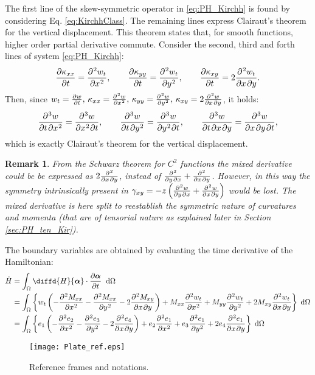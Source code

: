\documentclass[preprint,12pt]{elsarticle}
\newtheorem{remark}{Remark}
\newcommand{\revOne}[1]{\textcolor{blue!80!black}{#1}}
\begin{document}
\revOne{ The first line of the skew-symmetric operator in \eqref{eq:PH_Kirchh} is found by considering Eq. \eqref{eq:KirchhClass}. The remaining lines express Clairaut’s theorem for the vertical displacement. This theorem states that, for smooth functions, higher order partial derivative commute. Consider the second, third and forth lines of system \eqref{eq:PH_Kirchh}:
\[ \diffp{\kappa_{xx}}{t} = \diffp[2]{w_t}{x}, \qquad \diffp{\kappa_{yy}}{t} = \diffp[2]{w_t}{y}, \qquad  \diffp{\kappa_{xy}}{t} = 2 \diffp{w_t}{x,y}.
\] Then, since $w_t = \diffp{w}{t}, \, \kappa_{xx} = \diffp[2]{w}{x}, \, \kappa_{yy} = \diffp[2]{w}{y}, \, \kappa_{xy} = 2 \diffp{w}{x, y}$, it holds:
\[ \diffp[1,2]{w}{t,x} = \diffp[2,1]{w}{x,t}, \qquad \diffp[1,2]{w}{t,y} = \diffp[2,1]{w}{y,t}, \qquad  \diffp{w}{t,x,y} = \diffp{w}{x,y,t},  
\] 
which is exactly Clairaut’s theorem for the vertical displacement.
}
\begin{remark}
	From the Schwarz theorem for $C^2$ functions the mixed derivative could be be expressed as $2 \diffp{}{x,y}$, instead of $\diffp{}{y,x} + \diffp{}{x,y}$. However, in this way the symmetry intrinsically present in $\gamma_{xy} = -z \left( \diffp{w}{y,x} + \diffp{w}{x,y} \right)$ would be lost. The mixed derivative is here split to reestablish the symmetric nature of curvatures and momenta (that are of tensorial nature as explained later in Section \ref{sec:PH_ten_Kir}).
\end{remark}
The boundary variables are obtained by evaluating the time derivative of the Hamiltonian:
\begin{align*}
\dot{H} &= \int_\Omega \diffd{H}{\bm{\alpha}}   \cdot \diffp{\bm{\alpha}}{t} \; \d{\Omega} \\
&= \int_\Omega \left\{ w_t \left(-\diffp[2]{M_{xx}}{x} -\diffp[2]{M_{xx}}{y} - 2 \diffp{M_{xy}}{x,y} \right) + M_{xx} \diffp[2]{w_t}{x} + M_{yy} \diffp[2]{w_t}{y} + 2 M_{xy} \diffp{w_t}{x,y} \right\} \d{\Omega} \\
&= \int_\Omega \left\{ e_1 \left(-\diffp[2]{e_2}{x} -\diffp[2]{e_3}{y} - 2 \diffp{e_4}{x,y}\right) + e_2 \diffp[2]{e_1}{x} + e_3 \diffp[2]{e_1}{y} + 2 e_4 \diffp{e_1}{x,y}  \right\} \d{\Omega}
\end{align*}

\begin{figure}[t]
	\centering
	\texttt{[image: Plate\_ref.eps]}
	\caption{Reference frames and notations.}
	\label{fig:plate_ref}
\end{figure}
\end{document}

